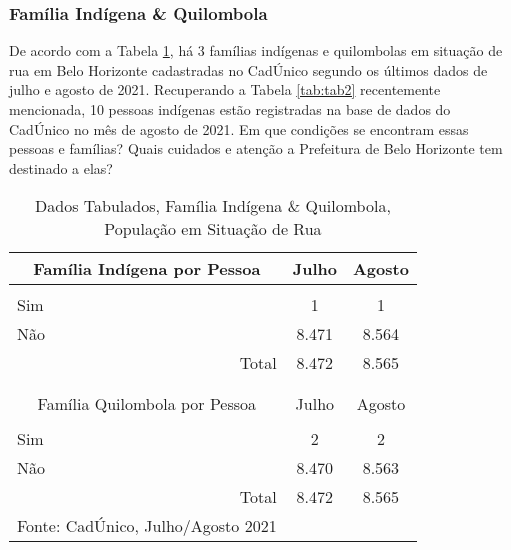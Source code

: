 \documentclass[12pt]{article}
\begin{document}
\subsubsection{Família Indígena \& Quilombola}

De acordo com a Tabela \ref{tab:tab5}, há 3 famílias indígenas e quilombolas em situação de rua em Belo Horizonte cadastradas no CadÚnico segundo os últimos dados de julho e agosto de 2021. Recuperando a Tabela \ref{tab:tab2} recentemente mencionada, 10 pessoas indígenas estão registradas na base de dados do CadÚnico no mês de agosto de 2021. Em que condições se encontram essas pessoas e famílias? Quais cuidados e atenção a Prefeitura de Belo Horizonte tem destinado a elas?\\

\begin{table}[htbp]
  \centering
  \caption{Dados Tabulados, Família Indígena \& Quilombola, População em Situação de Rua}
    \begin{tabular}{p{23.5em}rr}
    \hline
    \multicolumn{1}{c}{Família Indígena por Pessoa} & \multicolumn{1}{c}{Julho} & \multicolumn{1}{c}{Agosto} \\
    \midrule
    \multicolumn{1}{c}{} &      &  \\
    \multicolumn{1}{l}{Sim} & \multicolumn{1}{c}{1} & \multicolumn{1}{c}{1} \\
    \multicolumn{1}{l}{Não} & \multicolumn{1}{c}{8.471} & \multicolumn{1}{c}{8.564} \\
    \midrule
    \multicolumn{1}{r}{Total} & \multicolumn{1}{c}{8.472} & \multicolumn{1}{c}{8.565} \\
    \midrule
    \multicolumn{1}{r}{} &      &  \\
    \multicolumn{1}{r}{} &      &  \\
    \midrule
    \multicolumn{1}{c}{Família Quilombola por Pessoa} & \multicolumn{1}{c}{Julho} & \multicolumn{1}{c}{Agosto} \\
    \midrule
    \multicolumn{1}{c}{} &      &  \\
    \multicolumn{1}{l}{Sim} & \multicolumn{1}{c}{2} & \multicolumn{1}{c}{2} \\
    \multicolumn{1}{l}{Não} & \multicolumn{1}{c}{8.470} & \multicolumn{1}{c}{8.563} \\
    \midrule
    \multicolumn{1}{r}{Total} & \multicolumn{1}{c}{8.472} & \multicolumn{1}{c}{8.565} \\
    \midrule
    Fonte: CadÚnico, Julho/Agosto 2021 &      &  \\
    \end{tabular}%
  \label{tab:tab5}%
\end{table}%
\end{document}
